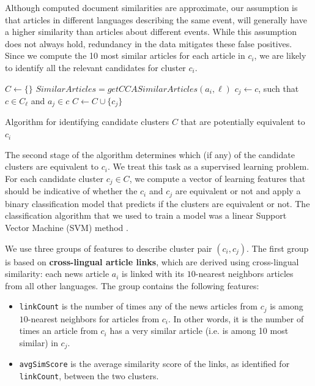 \documentclass[twoside,11pt]{article}
\begin{document}
Although computed document similarities are approximate, our  assumption is that articles in different languages describing the same event, will generally have a higher similarity than articles about different events. While this assumption does not always hold, redundancy in the data mitigates these false positives. Since we compute the 10 most similar articles for each article in $c_i$, we are likely to identify all the relevant candidates for cluster $c_i$.

\begin{algorithm}[t!]
$C \leftarrow \{\}$\;
 {
     {
        $SimilarArticles = getCCASimilarArticles(a_i, \ell)$\;
         {
            $c_j \leftarrow c$, such that $c \in C_\ell$ and $a_j \in c$\;
            $C \leftarrow C \cup \{ c_j \}$\;
        }
    }
}
\caption{Algorithm for identifying candidate clusters $C$ that are potentially equivalent to $c_i$}
\label{cluster_merge_algo1}
\end{algorithm}

The second stage of the algorithm determines which (if any) of the candidate clusters are equivalent to $c_i$. We treat this task as a supervised learning problem. For each candidate cluster $c_j \in C$, we compute a vector of learning features that should be indicative of whether the $c_i$ and $c_j$ are equivalent or not and apply a binary classification model that predicts if the clusters are equivalent or not. The classification algorithm that we used to train a model was a linear Support Vector Machine (SVM) method .

We use three groups of features to describe cluster pair $(c_i, c_j)$. The first group is based on {\bf cross-lingual article links}, which are derived using cross-lingual similarity: each news article $a_i$ is linked with its $10$-nearest neighbors articles from all other languages. The group contains the following features:

\begin{itemize}
\item \texttt{linkCount} is the number of times any of the news articles from $c_j$ is among $10$-nearest neighbors for articles from $c_i$. In other words, it is the number of times an article from $c_i$ has a very similar article (i.e. is among 10 most similar) in $c_j$.
\item \texttt{avgSimScore} is the average similarity score of the links, as identified for \texttt{linkCount}, between the two clusters.
\end{itemize}
\end{document}
